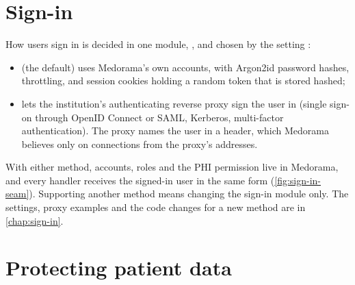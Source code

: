 \section{Sign-in}
\label{sec:architecture-sign-in}

How users sign in is decided in one module, , and chosen by the setting
:
\begin{itemize}
\item {} (the default) uses Medorama's own accounts, with Argon2id password hashes,
  throttling, and session cookies holding a random token that is stored hashed;
\item {} lets the institution's authenticating reverse proxy sign the user in (single
  sign-on through OpenID Connect or SAML, Kerberos, multi-factor authentication). The proxy names
  the user in a header, which Medorama believes only on connections from the proxy's addresses.
\end{itemize}
With either method, accounts, roles and the PHI permission live in Medorama, and every handler
receives the signed-in user in the same form (\cref{fig:sign-in-seam}). Supporting another
method means changing the sign-in module only. The settings, proxy examples and the code changes
for a new method are in \cref{chap:sign-in}.

\section{Protecting patient data}
\label{sec:architecture-privacy}

